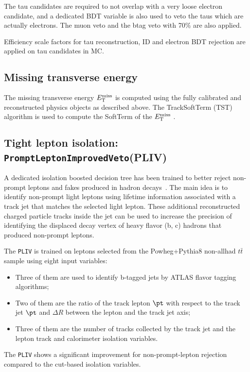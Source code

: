 The tau candidates are required to not overlap with a very loose electron candidate, and a dedicated BDT variable is also used to veto the taus which are actually electrons. The muon veto and the btag veto with 70\% are also applied. 

Efficiency scale factors for tau reconstruction, ID and electron BDT rejection \cite{TauCP} are applied on tau candidates in MC.

\subsection{Missing transverse energy}
The missing transverse energy $E_{\text{T}}^{\text{miss}}$ is computed using the fully calibrated and reconstructed physics objects as described above. The TrackSoftTerm (TST) algorithm is used to compute the SoftTerm of the $E_{\text{T}}^{\text{miss}}$ \cite{MET}. 

\subsection{Tight lepton isolation: \texttt{PromptLeptonImprovedVeto}(PLIV)}
\label{sec:Pliv}
A dedicated isolation boosted decision tree has been trained to better reject non-prompt leptons and fakes produced in hadron decays~\cite{ATL-COM-PHYS-2018-410}. The main idea is to identify non-prompt light leptons using lifetime information associated with a track jet that matches the selected light lepton. These additional reconstructed charged particle tracks inside the jet can be used to increase the precision of identifying the displaced decay vertex of heavy flavor (b, c) hadrons that produced non-prompt leptons.

The \texttt{PLIV} is trained on leptons selected from the Powheg+Pythia8 non-allhad $t\bar t$ sample using eight input variables:
\begin{itemize}
\item Three of them are used to identify b-tagged jets by ATLAS flavor tagging algorithms;
\item Two of them are the ratio of the track lepton $\pt$ with respect to the track jet $\pt$ and $\Delta R$ between the lepton and the track jet axis;
\item Three of them are the number of tracks collected by the track jet and the lepton track and calorimeter isolation variables. 
\end{itemize}

The \texttt{PLIV} shows a significant improvement for non-prompt-lepton rejection compared to the cut-based isolation variables.

